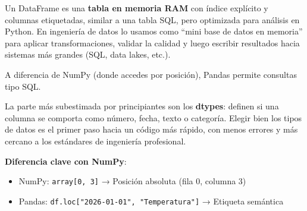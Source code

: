 \documentclass[11pt, a4paper]{article}
\begin{document}
Un DataFrame es una \textbf{tabla en memoria RAM} con índice explícito y columnas etiquetadas, similar a una tabla SQL, pero optimizada para análisis en Python. En ingeniería de datos lo usamos como ``mini base de datos en memoria'' para aplicar transformaciones, validar la calidad y luego escribir resultados hacia sistemas más grandes (SQL, data lakes, etc.).

A diferencia de NumPy (donde accedes por posición), Pandas permite consultas tipo SQL.

\begin{center}
\end{center}

La parte más subestimada por principiantes son los \textbf{dtypes}: definen si una columna se comporta como número, fecha, texto o categoría. Elegir bien los tipos de datos es el primer paso hacia un código más rápido, con menos errores y más cercano a los estándares de ingeniería profesional.

\textbf{Diferencia clave con NumPy}:
\begin{itemize}
    \item NumPy: \texttt{array[0, 3]} → Posición absoluta (fila 0, columna 3)
    \item Pandas: \texttt{df.loc["2026-01-01", "Temperatura"]} → Etiqueta semántica
\end{itemize}
\end{document}
